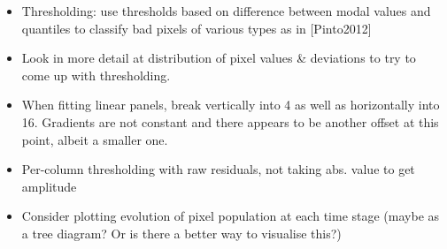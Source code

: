 \documentclass[10pt,fleqn]{article}
\begin{document}
\begin{itemize}

\item
Thresholding: use thresholds based on difference between modal values and quantiles to classify bad pixels of various types as in [Pinto2012]

\item Look in more detail at distribution of pixel values \& deviations to try to come up with thresholding.

\item When fitting linear panels, break vertically into 4 as well as horizontally into 16. Gradients are not constant and there appears to be another offset at this point, albeit a smaller one.

\item Per-column thresholding with raw residuals, not taking abs. value to get amplitude

\item
Consider plotting evolution of pixel population at each time stage (maybe as a tree diagram? Or is there a better way to visualise this?)





\end{itemize}

\end{document}
